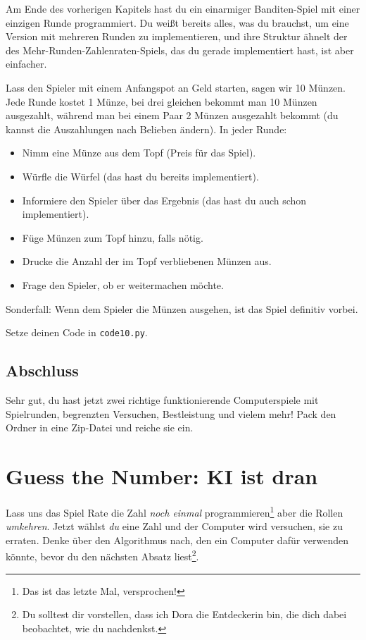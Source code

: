 \documentclass[
]{book}
\providecommand{\tightlist}{%
  \setlength{\itemsep}{0pt}\setlength{\parskip}{0pt}}
\begin{document}
Am Ende des vorherigen Kapitels hast du ein einarmiger Banditen-Spiel mit einer einzigen Runde programmiert. Du weißt bereits alles, was du brauchst, um eine Version mit mehreren Runden zu implementieren, und ihre Struktur ähnelt der des Mehr-Runden-Zahlenraten-Spiels, das du gerade implementiert hast, ist aber einfacher.

Lass den Spieler mit einem Anfangspot an Geld starten, sagen wir 10 Münzen. Jede Runde kostet 1 Münze, bei drei gleichen bekommt man 10 Münzen ausgezahlt, während man bei einem Paar 2 Münzen ausgezahlt bekommt (du kannst die Auszahlungen nach Belieben ändern). In jeder Runde:

\begin{itemize}
\tightlist
\item
  Nimm eine Münze aus dem Topf (Preis für das Spiel).
\item
  Würfle die Würfel (das hast du bereits implementiert).
\item
  Informiere den Spieler über das Ergebnis (das hast du auch schon implementiert).
\item
  Füge Münzen zum Topf hinzu, falls nötig.
\item
  Drucke die Anzahl der im Topf verbliebenen Münzen aus.
\item
  Frage den Spieler, ob er weitermachen möchte.
\end{itemize}

Sonderfall: Wenn dem Spieler die Münzen ausgehen, ist das Spiel definitiv vorbei.

Setze deinen Code in \texttt{code10.py}.

\hypertarget{abschluss}{%
\section{Abschluss}\label{abschluss}}

Sehr gut, du hast jetzt zwei richtige funktionierende Computerspiele mit Spielrunden, begrenzten Versuchen, Bestleistung und vielem mehr! Pack den Ordner in eine Zip-Datei und reiche sie ein.

\hypertarget{guess-the-number-ai}{%
\chapter{Guess the Number: KI ist dran}\label{guess-the-number-ai}}

Lass uns das Spiel Rate die Zahl \emph{noch einmal} programmieren\footnote{Das ist das letzte Mal, versprochen!} aber die Rollen \emph{umkehren}. Jetzt wählst \emph{du} eine Zahl und der Computer wird versuchen, sie zu erraten. Denke über den Algorithmus nach, den ein Computer dafür verwenden könnte, bevor du den nächsten Absatz liest\footnote{Du solltest dir vorstellen, dass ich Dora die Entdeckerin bin, die dich dabei beobachtet, wie du nachdenkst.}.
\end{document}
